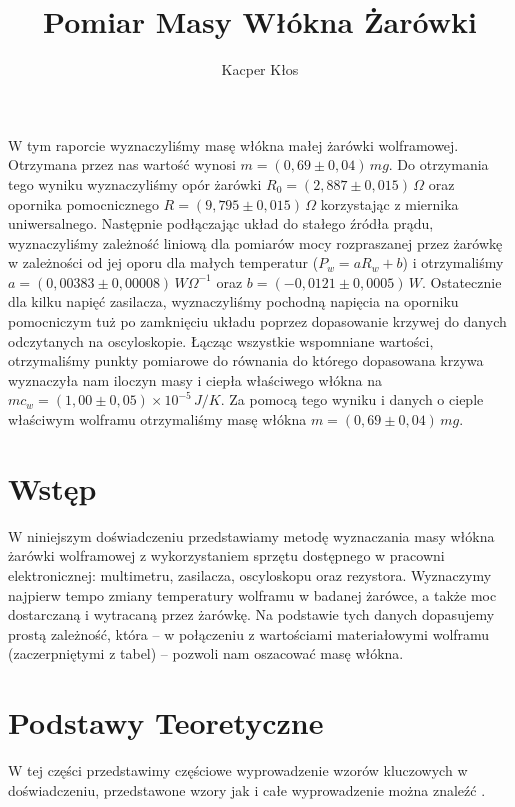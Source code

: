 \documentclass[12pt]{article}
\title{Pomiar Masy Włókna Żarówki}
\author{Kacper Kłos}
\begin{document}
\maketitle
W tym raporcie wyznaczyliśmy masę włókna małej żarówki wolframowej. Otrzymana przez nas wartość wynosi $m = (0{,}69 \pm 0{,}04) \, mg$. Do otrzymania tego wyniku wyznaczyliśmy opór żarówki $R_0 = (2{,}887 \pm 0{,}015) \, \Omega$ oraz opornika pomocnicznego $R = (9{,}795 \pm 0{,}015) \, \Omega$ korzystając z miernika uniwersalnego. Następnie podłączając układ do stałego źródła prądu, wyznaczyliśmy zależność liniową dla pomiarów mocy rozpraszanej przez żarówkę w zależności od jej oporu dla małych temperatur ($P_w = a R_w + b$) i otrzymaliśmy $a = (0{,}00383 \pm 0{,}00008) \, W \Omega^{-1}$ oraz $b = (-0{,}0121 \pm 0{,}0005) \, W$. Ostatecznie dla kilku napięć zasilacza, wyznaczyliśmy pochodną napięcia na oporniku pomocniczym tuż po zamknięciu układu poprzez dopasowanie krzywej do danych odczytanych na oscyloskopie. Łącząc wszystkie wspomniane wartości, otrzymaliśmy punkty pomiarowe do równania do którego dopasowana krzywa wyznaczyła nam iloczyn masy i ciepła właściwego włókna na $mc_w=(1{,}00 \pm 0{,}05) \times 10^{-5}\, J/K$. Za pomocą tego wyniku i danych o cieple właściwym wolframu otrzymaliśmy masę włókna $m = (0{,}69 \pm 0{,}04) \, mg$.
\newpage

\section{Wstęp}
W niniejszym doświadczeniu przedstawiamy metodę wyznaczania masy włókna żarówki wolframowej z wykorzystaniem sprzętu dostępnego w pracowni elektronicznej: multimetru, zasilacza, oscyloskopu oraz rezystora.  
Wyznaczymy najpierw tempo zmiany temperatury wolframu w badanej żarówce, a także moc dostarczaną i wytracaną przez żarówkę.  
Na podstawie tych danych dopasujemy prostą zależność, która – w połączeniu z wartościami materiałowymi wolframu (zaczerpniętymi z tabel) – pozwoli nam oszacować masę włókna.

\section{Podstawy Teoretyczne}
W tej części przedstawimy częściowe wyprowadzenie wzorów kluczowych w doświadczeniu, przedstawone wzory jak i całe wyprowadzenie można znaleźć \cite{skrypt}.
\end{document}
